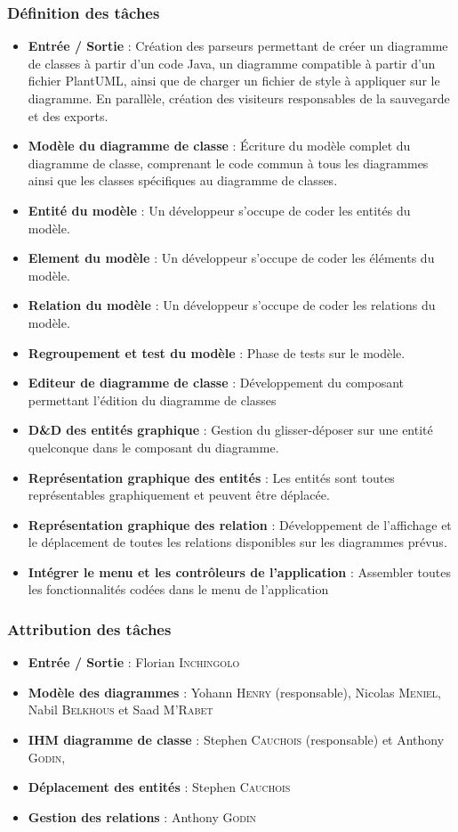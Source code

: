 \documentclass[hidelinks, 10pt,a4paper]{article}
\begin{document}
\subsubsection{Définition des tâches}
\begin{itemize}
\item \textbf{Entrée / Sortie} : Création des parseurs permettant de créer un diagramme de classes à partir d'un
code Java, un diagramme compatible à partir d'un fichier PlantUML, ainsi que de charger un fichier de style à appliquer sur le diagramme.
En parallèle, création des visiteurs responsables de la sauvegarde et des exports.
\item \textbf{Modèle du diagramme de classe} : Écriture du modèle complet du diagramme de classe, comprenant le code commun
à tous les diagrammes ainsi que les classes spécifiques au diagramme de classes.
\item \textbf{Entité du modèle} : Un développeur s'occupe de coder les entités du modèle.
\item \textbf{Element du modèle} : Un développeur s'occupe de coder les éléments du modèle. 
\item \textbf{Relation du modèle} : Un développeur s'occupe de coder les relations du modèle.
\item \textbf{Regroupement et test du modèle} : Phase de tests sur le modèle.
\item \textbf{Editeur de diagramme de classe} : Développement du composant permettant l'édition du diagramme de classes
\item \textbf{D\&D des entités graphique} : Gestion du glisser-déposer sur une entité quelconque dans le composant du diagramme.
\item \textbf{Représentation graphique des entités} : Les entités sont toutes représentables graphiquement et peuvent être déplacée.
\item \textbf{Représentation graphique des relation} : Développement de l'affichage et le déplacement de toutes les relations 
      disponibles sur les diagrammes prévus.
\item \textbf{Intégrer le menu et les contrôleurs de l'application} : Assembler toutes les fonctionnalités codées dans le menu de l'application
\end{itemize}

\subsubsection{Attribution des tâches}
\begin{itemize}
\item \textbf{Entrée / Sortie} : Florian \textsc{Inchingolo}
\item \textbf{Modèle des diagrammes} : Yohann \textsc{Henry} (responsable), Nicolas \textsc{Meniel},
Nabil \textsc{Belkhous} et Saad \textsc{M'Rabet}
\item \textbf{IHM diagramme de classe} : Stephen \textsc{Cauchois} (responsable) et Anthony \textsc{Godin},
\item \textbf{Déplacement des entités} : Stephen \textsc{Cauchois}
\item \textbf{Gestion des relations} : Anthony \textsc{Godin}
\end{itemize}
\end{document}
